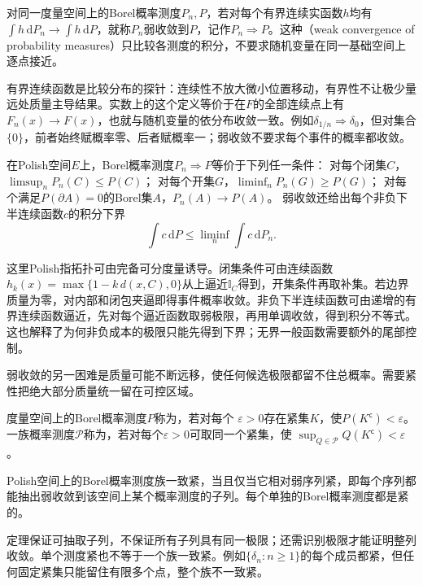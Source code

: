 \begin{definition}[概率测度的弱收敛]
\label{def:information-weak-measure-convergence}
对同一度量空间上的Borel概率测度\(P_n,P\)，若对每个有界连续实函数\(h\)均有
\(\int h\,\mathrm dP_n\to\int h\,\mathrm dP\)，就称\(P_n\)弱收敛到\(P\)，记作\(P_n\Rightarrow P\)。这种（weak convergence of probability measures）只比较各测度的积分，不要求随机变量在同一基础空间上逐点接近。
\end{definition}
有界连续函数是比较分布的探针：连续性不放大微小位置移动，有界性不让极少量远处质量主导结果。实数上的这个定义等价于在\(F\)的全部连续点上有\(F_n(x)\to F(x)\)，也就与随机变量的依分布收敛一致。例如\(\delta_{1/n}\Rightarrow\delta_0\)，但对集合\(\{0\}\)，前者始终赋概率零、后者赋概率一；弱收敛不要求每个事件的概率都收敛。

\begin{theorem}[Portmanteau的常用形式]
\label{thm:rv-portmanteau}
在Polish空间\(E\)上，Borel概率测度\(P_n\Rightarrow P\)等价于下列任一条件：
对每个闭集\(C\)，\(\limsup_nP_n(C)\leq P(C)\)；
对每个开集\(G\)，\(\liminf_nP_n(G)\geq P(G)\)；
对每个满足\(P(\partial A)=0\)的Borel集\(A\)，\(P_n(A)\to P(A)\)。
弱收敛还给出每个非负下半连续函数\(c\)的积分下界
\[
\int c\,\mathrm dP\leq\liminf_n\int c\,\mathrm dP_n.
\]
\end{theorem}
这里Polish指拓扑可由完备可分度量诱导。闭集条件可由连续函数
\(h_k(x)=\max\{1-k\,d(x,C),0\}\)从上逼近\(\mathbb I_C\)得到，开集条件再取补集。若边界质量为零，对内部和闭包夹逼即得事件概率收敛。非负下半连续函数可由递增的有界连续函数逼近，先对每个逼近函数取弱极限，再用单调收敛，得到积分不等式。这也解释了为何非负成本的极限只能先得到下界；无界一般函数需要额外的尾部控制。

弱收敛的另一困难是质量可能不断远移，使任何候选极限都留不住总概率。需要紧性把绝大部分质量统一留在可控区域。
\begin{definition}[紧概率测度与一致紧族]
\label{def:information-tightness}
度量空间上的Borel概率测度\(P\)称为，若对每个
\(\varepsilon>0\)存在紧集\(K\)，使\(P(K^{\mathsf c})<\varepsilon\)。
一族概率测度\(\mathcal P\)称为，若对每个\(\varepsilon>0\)可取同一个紧集，使
\(\sup_{Q\in\mathcal P}Q(K^{\mathsf c})<\varepsilon\)。
\end{definition}
\begin{theorem}[Prokhorov定理]
\label{thm:rv-prokhorov}
Polish空间上的Borel概率测度族一致紧，当且仅当它相对弱序列紧，即每个序列都能抽出弱收敛到该空间上某个概率测度的子列。每个单独的Borel概率测度都是紧的。
\end{theorem}
定理保证可抽取子列，不保证所有子列具有同一极限；还需识别极限才能证明整列收敛。单个测度紧也不等于一个族一致紧。例如\(\{\delta_n:n\geq1\}\)的每个成员都紧，但任何固定紧集只能留住有限多个点，整个族不一致紧。

